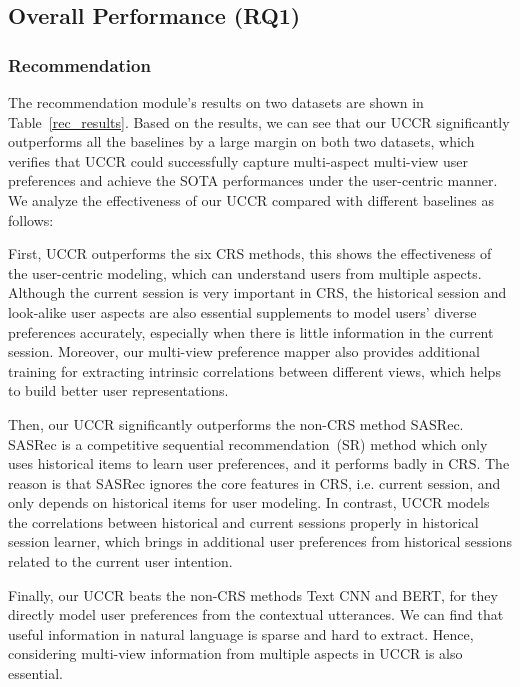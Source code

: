 \documentclass[sigconf,natbib=true]{acmart}
\begin{document}
\subsection{Overall Performance (RQ1)}

\subsubsection{Recommendation}

The recommendation module's results on two datasets are shown in Table~\ref{rec_results}. Based on the results, we can see that our UCCR significantly outperforms all the baselines by a large margin on both two datasets, which verifies that UCCR could successfully capture multi-aspect multi-view user preferences and achieve the SOTA performances under the user-centric manner.
We analyze the effectiveness of our UCCR compared with different baselines as follows:

First, UCCR outperforms the six CRS methods, this shows the effectiveness of the user-centric modeling, which can understand users from multiple aspects. Although the current session is very important in CRS, the historical session and look-alike user aspects are also essential supplements to model users' diverse preferences accurately, especially when there is little information in the current session.
Moreover, our multi-view preference mapper also provides additional training for extracting intrinsic correlations between different views, which helps to build better user representations.

Then, our UCCR significantly outperforms the non-CRS method SASRec. SASRec is a competitive sequential recommendation~(SR) method which only uses historical items to learn user preferences, and it performs badly in CRS.
The reason is that SASRec ignores the core features in CRS, i.e. current session, and only depends on historical items for user modeling. In contrast, UCCR models the correlations between historical and current sessions properly in historical session learner, which brings in additional user preferences from historical sessions related to the current user intention.

Finally, our UCCR beats the non-CRS methods Text CNN and BERT, for they directly model user preferences from the contextual utterances. We can find that useful information in natural language is sparse and hard to extract. Hence, considering multi-view information from multiple aspects in UCCR is also essential.
\end{document}
